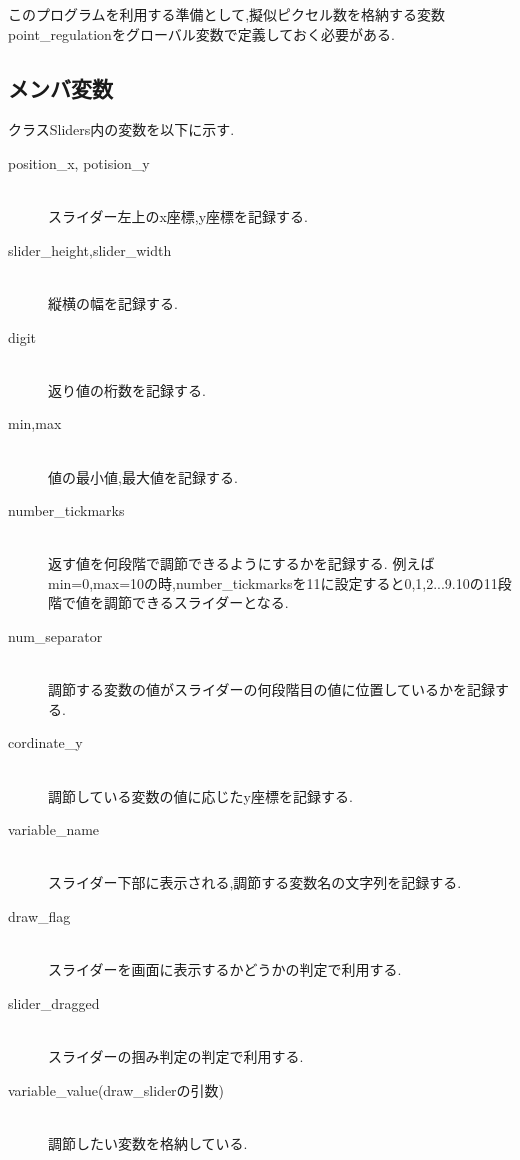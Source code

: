 このプログラムを利用する準備として,擬似ピクセル数を格納する変数point\_regulationをグローバル変数で定義しておく必要がある.

 \subsection{メンバ変数}
 クラスSliders内の変数を以下に示す.
 \begin{description}
 \item[position\_x, potision\_y]\mbox{}\\
 スライダー左上のx座標,y座標を記録する.
 \item[slider\_height,slider\_width]\mbox{}\\
 縦横の幅を記録する.
  \item[digit]\mbox{}\\
  返り値の桁数を記録する.
   \item[min,max]\mbox{}\\
   値の最小値,最大値を記録する.
    \item[number\_tickmarks]\mbox{}\\
    返す値を何段階で調節できるようにするかを記録する.
    例えばmin=0,max=10の時,number\_tickmarksを11に設定すると0,1,2...9.10の11段階で値を調節できるスライダーとなる.
    \item[num\_separator]\mbox{}\\
    調節する変数の値がスライダーの何段階目の値に位置しているかを記録する.
        \item[cordinate\_y]\mbox{}\\
        調節している変数の値に応じたy座標を記録する.
     \item[variable\_name]\mbox{}\\
     スライダー下部に表示される,調節する変数名の文字列を記録する.
          \item[draw\_flag]\mbox{}\\
     スライダーを画面に表示するかどうかの判定で利用する.
          \item[slider\_dragged]\mbox{}\\
     スライダーの掴み判定の判定で利用する.
      \item[variable\_value(draw\_sliderの引数)]\mbox{}\\
      調節したい変数を格納している.
 \end{description}
 
